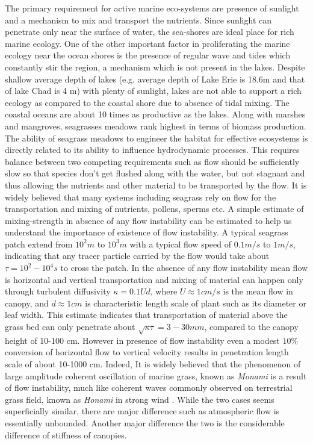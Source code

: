 \documentclass[12pt]{report}   %
\begin{document}
The primary requirement for active marine eco-systems are presence of sunlight and a mechanism to mix and transport the nutrients. Since sunlight can penetrate only near the surface of water, the sea-shores are ideal place for rich marine ecology. One of the other important factor in proliferating the marine ecology near the ocean shores is the presence of regular wave and tides which constantly stir the region, a mechanism which is not present in the lakes. Despite shallow average depth of lakes (e.g. average depth of Lake Erie is 18.6m and that of lake Chad is 4 m) with plenty of sunlight, lakes are not able to support a rich ecology as compared to the coastal shore due to absence of tidal mixing. The coastal oceans are about 10 times as productive as the lakes\cite{nixon1988}. Along with marshes and mangroves, seagrasses meadows rank highest in terms of biomass production.
\newline
The ability of seagrass meadows to engineer the habitat for effective ecosystems is directly related to its ability to influence hydrodynamic processes. This requires balance between
two competing requirements such as flow should be sufficiently slow so that species don't get flushed along with the water, but not stagnant and thus allowing the nutrients and other material to be transported by the flow. It is widely believed that many systems including seagrass rely on flow for the transportation and mixing of nutrients, pollens, sperms etc. A simple estimate of mixing-strength in absence of any flow instability can be estimated to help us understand the importance of existence of flow instability. A typical seagrass patch extend from $10^2 m$ to $10^3 m$ with a typical flow speed of $0.1 m/s$ to $1 m/s$, indicating that any tracer particle carried by the flow would take about $\tau = 10^2-10^4 s$ to cross the patch. In the absence of any flow instability mean flow is horizontal and vertical transportation and mixing of material can happen only through turbulent diffusivity $\kappa =  0.1 U d$, where $ U \approx 1 cm/s$ is the mean flow in canopy, and $d \approx 1cm $ is characteristic 
length scale of plant such as its diameter or leaf width\cite{Nepf99}. This estimate indicates that transportation of material above the grass bed can only penetrate about $\sqrt{\kappa \tau} = 3-30 mm $, compared to the canopy height of 10-100 cm. However in presence of flow instability even a modest $10\%$ conversion of horizontal flow to vertical velocity results in penetration length scale of about 10-1000 cm. Indeed, It is widely believed that the phenomenon of large amplitude coherent oscillation of marine grass, known as \textit{Monami} is a result of flow instability, much like coherent waves commonly observed on terrestrial grass field, known as \textit{Honami} in strong wind \cite{Inoue55_1, Inoue55_2, Raupach96, Delangre06}. While the two cases seems superficially similar, there are major difference such as atmospheric flow is essentially unbounded. Another major difference the two is the considerable difference of stiffness of canopies.
\end{document}
